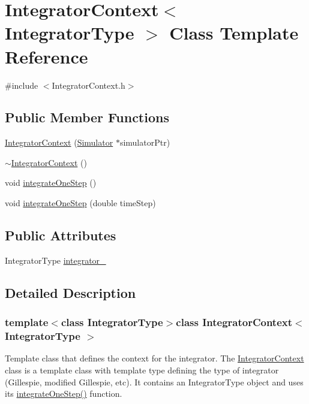 \hypertarget{class_integrator_context}{\section{\-Integrator\-Context$<$ \-Integrator\-Type $>$ \-Class \-Template \-Reference}
\label{class_integrator_context}
}


{\ttfamily \#include $<$\-Integrator\-Context.\-h$>$}

\subsection*{\-Public \-Member \-Functions}
\begin{DoxyCompactItemize}
\item 
\hyperlink{class_integrator_context_a020c17d49d7cee23c24a850213c75d15}{\-Integrator\-Context} (\hyperlink{class_simulator}{\-Simulator} $\ast$simulator\-Ptr)
\item 
\hyperlink{class_integrator_context_a0c2a801de04ed8799d51448cc68ef513}{$\sim$\-Integrator\-Context} ()
\item 
void \hyperlink{class_integrator_context_a72b6def867485fd2710fb55b4602194e}{integrate\-One\-Step} ()
\item 
void \hyperlink{class_integrator_context_ac2e7c5186de42a0cf400277f72942966}{integrate\-One\-Step} (double time\-Step)
\end{DoxyCompactItemize}
\subsection*{\-Public \-Attributes}
\begin{DoxyCompactItemize}
\item 
\-Integrator\-Type \hyperlink{class_integrator_context_a16de83daa9438581f2c1c42540bb9299}{integrator\-\_\-}
\end{DoxyCompactItemize}


\subsection{\-Detailed \-Description}
\subsubsection*{template$<$class \-Integrator\-Type$>$class Integrator\-Context$<$ Integrator\-Type $>$}

\-Template class that defines the context for the integrator. \-The \hyperlink{class_integrator_context}{\-Integrator\-Context} class is a template class with template type defining the type of integrator (\-Gillespie, modified \-Gillespie, etc). \-It contains an \-Integrator\-Type object and uses its \hyperlink{class_integrator_context_a72b6def867485fd2710fb55b4602194e}{integrate\-One\-Step()} function. 


